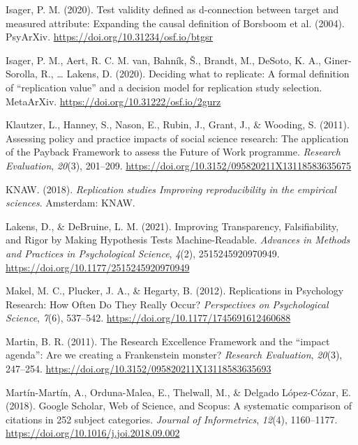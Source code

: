 \documentclass[
  english,
  jou,floatsintext]{apa6}
\newlength{\cslhangindent}
\newenvironment{cslreferences}%
  {\setlength{\parindent}{0pt}%
  \everypar{\setlength{\hangindent}{\cslhangindent}}\ignorespaces}%
  {\par}
\begin{document}
\begin{cslreferences}
\leavevmode\hypertarget{ref-Isager2020a}{}%
Isager, P. M. (2020). Test validity defined as d-connection between target and measured attribute: Expanding the causal definition of Borsboom et al. (2004). PsyArXiv. \url{https://doi.org/10.31234/osf.io/btgsr}

\leavevmode\hypertarget{ref-Isager2020}{}%
Isager, P. M., Aert, R. C. M. van, Bahník, Š., Brandt, M., DeSoto, K. A., Giner-Sorolla, R., \ldots{} Lakens, D. (2020). Deciding what to replicate: A formal definition of ``replication value'' and a decision model for replication study selection. MetaArXiv. \url{https://doi.org/10.31222/osf.io/2gurz}

\leavevmode\hypertarget{ref-Klautzer2011}{}%
Klautzer, L., Hanney, S., Nason, E., Rubin, J., Grant, J., \& Wooding, S. (2011). Assessing policy and practice impacts of social science research: The application of the Payback Framework to assess the Future of Work programme. \emph{Research Evaluation}, \emph{20}(3), 201--209. \url{https://doi.org/10.3152/095820211X13118583635675}

\leavevmode\hypertarget{ref-KNAW2018}{}%
KNAW. (2018). \emph{Replication studies Improving reproducibility in the empirical sciences}. Amsterdam: KNAW.

\leavevmode\hypertarget{ref-Lakens2021a}{}%
Lakens, D., \& DeBruine, L. M. (2021). Improving Transparency, Falsifiability, and Rigor by Making Hypothesis Tests Machine-Readable. \emph{Advances in Methods and Practices in Psychological Science}, \emph{4}(2), 2515245920970949. \url{https://doi.org/10.1177/2515245920970949}

\leavevmode\hypertarget{ref-Makel2012}{}%
Makel, M. C., Plucker, J. A., \& Hegarty, B. (2012). Replications in Psychology Research: How Often Do They Really Occur? \emph{Perspectives on Psychological Science}, \emph{7}(6), 537--542. \url{https://doi.org/10.1177/1745691612460688}

\leavevmode\hypertarget{ref-Martin2011}{}%
Martin, B. R. (2011). The Research Excellence Framework and the ``impact agenda'': Are we creating a Frankenstein monster? \emph{Research Evaluation}, \emph{20}(3), 247--254. \url{https://doi.org/10.3152/095820211X13118583635693}

\leavevmode\hypertarget{ref-Martin-Martin2018}{}%
Martín-Martín, A., Orduna-Malea, E., Thelwall, M., \& Delgado López-Cózar, E. (2018). Google Scholar, Web of Science, and Scopus: A systematic comparison of citations in 252 subject categories. \emph{Journal of Informetrics}, \emph{12}(4), 1160--1177. \url{https://doi.org/10.1016/j.joi.2018.09.002}


\end{cslreferences}
\end{document}
